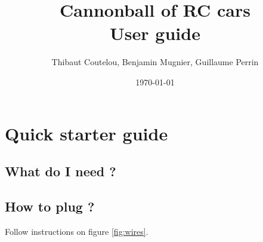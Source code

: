 \documentclass[a4paper,11pt]{report}
\title{Cannonball of RC cars\\User guide}
\author{Thibaut Coutelou, Benjamin Mugnier, Guillaume Perrin}
\date{\today}
\begin{document}
\maketitle
\tableofcontents

\setlength{\parskip}{3mm}










\chapter{Quick starter guide}

\section{What do I need ?}

\section{How to plug ?}

Follow instructions on figure \ref{fig:wires}.
\end{document}
